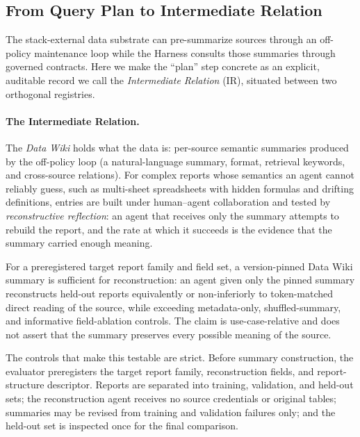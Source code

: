 \subsection{From Query Plan to Intermediate Relation}
\label{sec:intermediate-relation}

The stack-external data substrate can pre-summarize sources through an off-policy maintenance loop while the Harness consults those summaries through governed contracts. Here we make the ``plan'' step concrete as an explicit, auditable record we call the \textit{Intermediate Relation} (IR), situated between two orthogonal registries.

\paragraph{The Intermediate Relation.}
The \textit{Data Wiki} holds what the data is: per-source semantic summaries produced by the off-policy loop (a natural-language summary, format, retrieval keywords, and cross-source relations). For complex reports whose semantics an agent cannot reliably guess, such as multi-sheet spreadsheets with hidden formulas and drifting definitions, entries are built under human--agent collaboration and tested by \textit{reconstructive reflection}: an agent that receives only the summary attempts to rebuild the report, and the rate at which it succeeds is the evidence that the summary carried enough meaning.

\begin{proposition}
\label{prop:p16}
For a preregistered target report family and field set, a version-pinned Data Wiki summary is sufficient for reconstruction: an agent given only the pinned summary reconstructs held-out reports equivalently or non-inferiorly to token-matched direct reading of the source, while exceeding metadata-only, shuffled-summary, and informative field-ablation controls. The claim is use-case-relative and does not assert that the summary preserves every possible meaning of the source.
\end{proposition}

The controls that make this testable are strict. Before summary construction, the evaluator preregisters the target report family, reconstruction fields, and report-structure descriptor. Reports are separated into training, validation, and held-out sets; the reconstruction agent receives no source credentials or original tables; summaries may be revised from training and validation failures only; and the held-out set is inspected once for the final comparison.


